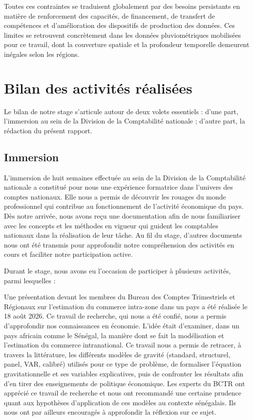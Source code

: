 \documentclass[12pt,a4paper]{report}
\begin{document}
Toutes ces contraintes se traduisent globalement par des besoins persistants en matière de renforcement des capacités, de financement, de transfert de compétences et d'amélioration des dispositifs de production des données. Ces limites se retrouvent concrètement dans les données pluviométriques mobilisées pour ce travail, dont la couverture spatiale et la profondeur temporelle demeurent inégales selon les régions.

\section{Bilan des activités réalisées}

Le bilan de notre stage s’articule autour de deux volets essentiels : d’une part, l’immersion au sein de la Division de la Comptabilité nationale ; d’autre part, la rédaction du présent rapport.

\subsection{Immersion}

L'immersion de huit semaines effectuée au sein de la Division de la Comptabilité nationale a constitué pour nous une expérience formatrice dans l'univers des comptes nationaux. Elle nous a permis de découvrir les rouages du monde professionnel qui contribue au fonctionnement de l'activité économique du pays. Dès notre arrivée, nous avons reçu une documentation afin de nous familiariser avec les concepts et les méthodes en vigueur qui guident les comptables nationaux dans la réalisation de leur tâche. Au fil du stage, d'autres documents nous ont été transmis pour approfondir notre compréhension des activités en cours et faciliter notre participation active.

Durant le stage, nous avons eu l'occasion de participer à plusieurs activités, parmi lesquelles :

Une présentation devant les membres du Bureau des Comptes Trimestriels et Régionaux sur l'estimation du commerce intra-zone dans un pays a été réalisée le 18 août 2026. Ce travail de recherche, qui nous a été confié, nous a permis d'approfondir nos connaissances en économie. L'idée était d'examiner, dans un pays africain comme le Sénégal, la manière dont se fait la modélisation et l'estimation du commerce intranational. Ce travail nous a permis de retracer, à travers la littérature, les différents modèles de gravité (standard, structurel, panel, VAR, calibré) utilisés pour ce type de problème, de formaliser l'équation gravitationnelle et ses variables explicatives, puis de confronter les résultats afin d'en tirer des enseignements de politique économique. Les experts du BCTR ont apprécié ce travail de recherche et nous ont recommandé une certaine prudence quant aux hypothèses d'application de ces modèles au contexte sénégalais. Ils nous ont par ailleurs encouragés à approfondir la réflexion sur ce sujet.
\end{document}
